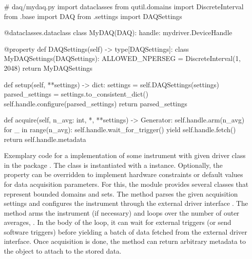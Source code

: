 \begin{listing}[htpb]
    \begin{pycode}
        # daq/mydaq.py
        import dataclasses
        from qutil.domains import DiscreteInterval
        from .base import DAQ
        from .settings import DAQSettings

        @dataclasses.dataclass
        class MyDAQ(DAQ):
            handle: mydriver.DeviceHandle

            @property
            def DAQSettings(self) -> type[DAQSettings]:
                class MyDAQSettings(DAQSettings):
                    ALLOWED_NPERSEG = DiscreteInterval(1, 2048)
                return MyDAQSettings

            def setup(self, **settings) -> dict:
                settings = self.DAQSettings(settings)
                parsed_settings = settings.to_consistent_dict()
                self.handle.configure(parsed_settings)
                return parsed_settings

            def acquire(self, n_avg: int, *, **settings) -> Generator:
                self.handle.arm(n_avg)
                for _ in range(n_avg):
                    self.handle.wait_for_trigger()
                    yield self.handle.fetch()
                return self.handle.metadata
    \end{pycode}
    \caption[ pseudocode]{
        Exemplary code for a  implementation of some instrument with given driver class  in the package .
        The  class is instantiated with a  instance.
        Optionally, the  property can be overridden to implement hardware constraints or default values for data acquisition parameters.
        For this, the  module provides several classes that represent bounded domains and sets.
        The  method parses the given acquisition settings and configures the instrument through the external driver interface .
        The  method arms the instrument (if necessary) and loops over the number of outer averages, .
        In the body of the loop, it can wait for external triggers (or send software triggers) before yielding a batch of data fetched from the external driver interface.
        Once acquisition is done, the method can return arbitrary metadata to the  object to attach to the stored data.
    }
    \label{lst:speck:daq:pseudocode}
\end{listing}

